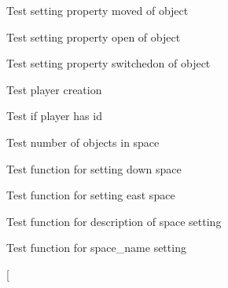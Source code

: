 \begin{DoxyRefList}
\item[\label{test__test000078}%
\hypertarget{test__test000078}{}%
Global \hyperlink{object__test_8c_a7789238ee5681e10b4d49e6e9f457d40}{test3\+\_\+object\+\_\+set\+\_\+prop\+\_\+\+Moved} ()]Test setting property moved of object  
\item[\label{test__test000093}%
\hypertarget{test__test000093}{}%
Global \hyperlink{object__test_8c_ae36abb53263ed855bde4dc2f47195813}{test3\+\_\+object\+\_\+set\+\_\+prop\+\_\+\+Open} ()]Test setting property open of object  
\item[\label{test__test000088}%
\hypertarget{test__test000088}{}%
Global \hyperlink{object__test_8c_a404400e229425a94d3ef8c5d826ece78}{test3\+\_\+object\+\_\+set\+\_\+prop\+\_\+\+Switched\+On} ()]Test setting property switchedon of object  
\item[\label{test__test000107}%
\hypertarget{test__test000107}{}%
Global \hyperlink{player__test_8c_aae84b37f9cc0fbde18a62807385c359a}{test3\+\_\+player\+\_\+create} ()]Test player creation  
\item[\label{test__test000112}%
\hypertarget{test__test000112}{}%
Global \hyperlink{player__test_8c_a3b450c7540eddb05810dc9c25e4de082}{test3\+\_\+player\+\_\+has\+\_\+id} ()]Test if player has id  
\item[\label{test__test000129}%
\hypertarget{test__test000129}{}%
Global \hyperlink{space__test_8c_ace18d8edf7b88e4b4d3e84dfa0b244bf}{test3\+\_\+space\+\_\+get\+\_\+object\+\_\+number} ()]Test number of objects in space  
\item[\label{test__test000179}%
\hypertarget{test__test000179}{}%
Global \hyperlink{space__test_8c_a38591396f4d83f2f2783de8944fe93eb}{test3\+\_\+space\+\_\+set\+\_\+down} ()]Test function for setting down space  
\item[\label{test__test000160}%
\hypertarget{test__test000160}{}%
Global \hyperlink{space__test_8c_adf98486d8745110660515d14b71b5656}{test3\+\_\+space\+\_\+set\+\_\+east} ()]Test function for setting east space  
\item[\label{test__test000142}%
\hypertarget{test__test000142}{}%
Global \hyperlink{space__test_8c_a1273cecbf0126415fa33af5639ee3058}{test3\+\_\+space\+\_\+set\+\_\+long\+\_\+description} ()]Test function for description of space setting  
\item[\label{test__test000132}%
\hypertarget{test__test000132}{}%
Global \hyperlink{space__test_8c_aa24a337830006e33706ab6ac1c416b47}{test3\+\_\+space\+\_\+set\+\_\+name} ()]Test function for space\+\_\+name setting  
\item[\label{test__test000150}%

\end{DoxyRefList}

